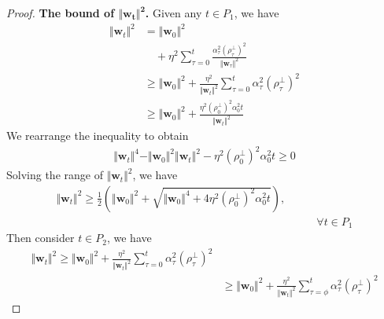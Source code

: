 \documentclass[10pt,a4paper]{amsart}
\begin{document}
\begin{proof}
  \noindent\textbf{The bound of $\boldsymbol{\Vert \mathbf{w}_t \Vert^2}$.}
  Given any $t \in P_1$, we have 
  \begin{equation*}
  \begin{aligned}
    \Vert \mathbf{w}_t \Vert^2 & = 
    \Vert \mathbf{w}_{0} \Vert^2 
    \\ & \quad
    +
    \eta^2 \sum_{\tau = 0}^{t}  
    \frac{\alpha_{\tau}^2 \left(\rho_{\tau}^{\perp}\right)^2}{\Vert \mathbf{w}_{\tau} \Vert^2}
    \\ & \ge
    \Vert \mathbf{w}_{0} \Vert^2
    +
    \frac{\eta^2}{\Vert \mathbf{w}_{t} \Vert^2}
    \sum_{\tau = 0}^{t}
      \alpha_{\tau}^2 \left(\rho_{\tau}^{\perp}\right)^2
    \\ & \ge
    \Vert \mathbf{w}_{0} \Vert^2
    +
    \frac{
      \eta^2 \left(\rho_{0}^{\perp}\right)^2 \alpha_{0}^2 t
    }{
      \Vert \mathbf{w}_{t} \Vert^2
    }
  \end{aligned}
  \end{equation*}
  We rearrange the inequality to obtain
  \begin{equation*}
  \begin{aligned}
    \Vert \mathbf{w}_t \Vert^4
    -
    \Vert \mathbf{w}_{0} \Vert^2 \Vert \mathbf{w}_t \Vert^2
    -
    \eta^2 (\rho_{0}^{\perp})^2 \alpha_0^2 t
    \ge 0
  \end{aligned}
  \end{equation*}
  Solving the range of $\Vert \mathbf{w}_t \Vert^2$, we have
  \begin{equation*}
  \begin{aligned}
    \Vert \mathbf{w}_t \Vert^2 \ge 
    \frac{1}{2}
    \left(
      \Vert \mathbf{w}_0 \Vert^2 
      +
      \sqrt{
        \Vert \mathbf{w}_0 \Vert^4
        +
        4  \eta^2 (\rho_{0}^{\perp})^2 \alpha_0^2 t
      }
    \right),
    \\ & \qquad \forall t \in P_1
  \end{aligned}
  \end{equation*}
  Then consider $t \in P_2$, we have 
  \begin{equation*}
  \begin{aligned}
    \Vert \mathbf{w}_t \Vert^2 
    \ge 
    \Vert \mathbf{w}_{0} \Vert^2 + 
    \frac{\eta^2}{\Vert \mathbf{w}_{t} \Vert^2}
    \sum_{\tau = 0}^{t} \alpha_{\tau}^2 \left(\rho_{\tau}^{\perp}\right)^2
    \\ & \ge 
    \Vert \mathbf{w}_{0} \Vert^2 + 
    \frac{\eta^2}{\Vert \mathbf{w}_{t} \Vert^2}
    \sum_{\tau = \phi}^{t} \alpha_{\tau}^2 \left(\rho_{\tau}^{\perp}\right)^2

\end{aligned}
\end{equation*}
\end{proof}
\end{document}
